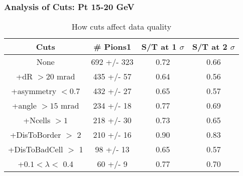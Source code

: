 \frame
{
\frametitle{Analysis of Cuts: Pt 15-20 GeV}
\begin{table}
\caption{How cuts affect data quality}
\centering
\begin{tabular}{c c c c}
\hline\hline
Cuts & \# Pions1 & S/T at 1 $\sigma$ & S/T at 2 $\sigma$ \\ [0.5ex]
\hline
None &  692 +/-  323 & 0.72 & 0.66 \\ %
+dR $> 20$ mrad &  435 +/-   57 & 0.64 & 0.56 \\ %
+asymmetry $< 0.7$ &  432 +/-   27 & 0.65 & 0.57 \\ %
+angle $> 15$ mrad &  234 +/-   18 & 0.77 & 0.69 \\ %
+Ncells $> 1$&  218 +/-   30 & 0.73 & 0.65 \\ %
+DisToBorder $>$ 2 &  210 +/-   16 & 0.90 & 0.83 \\ %
+DisToBadCell $>$ 1&   98 +/-   13 & 0.65 & 0.57 \\ %
+$0.1 < \lambda <$ 0.4 &   60 +/-    9 & 0.77 & 0.70 \\ %
[1ex]
\hline
\end{tabular}
\label{table:nonlin}
\end{table}
}
